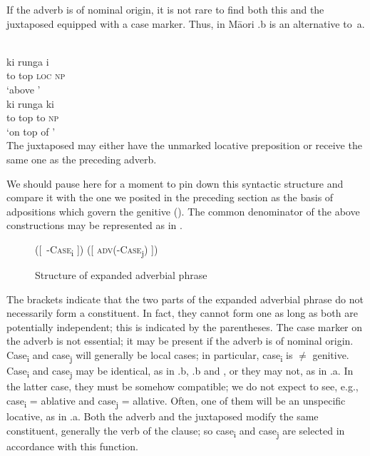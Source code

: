 If the adverb is of nominal origin, it is not rare to find both this and the juxtaposed \np equipped with a case marker. Thus, in M\=aori .b is an alternative to~a.

\ea\label{ex:E67}
 \\
 \ea
 \gll ki  runga  i  \np  \\
  to  top  \textsc{loc}  \textsc{np} \\
\glt ‘above \np’\\
\ex
\gll ki  runga  ki  \np  \\
  to  top to  \textsc{np} \\
  \glt ‘on top of \np’\\
\z
\z
\noindent The juxtaposed \np may either have the unmarked locative preposition or receive the same one as the preceding adverb.

We should pause here for a moment to pin down this syntactic structure and compare it with the one we posited in the preceding section as the basis of adpositions which govern the genitive (). The common denominator of the above constructions may be represented as in .

\begin{figure}
([~\np-\textsc{Case}\textsubscript{i} ])  ([ \textsc{adv}(-\textsc{Case}\textsubscript{j}) ])
\caption{Structure of expanded adverbial phrase}\label{ex:F5}
\end{figure}

\noindent The brackets indicate that the two parts of the expanded adverbial phrase do not necessarily form a constituent. In fact, they cannot form one as long as both are potentially independent; this is indicated by the parentheses. The case marker on the adverb is not essential; it may be present if the adverb is of nominal origin. Case\textsubscript{i} and case\textsubscript{j} will generally be local cases; in particular, case\textsubscript{i} is ${\neq}$ genitive. Case\textsubscript{i} and case\textsubscript{j} may be identical, as in .b, .b and , or they may not, as in .a. In the latter case, they must be somehow compatible; we do not expect to see, e.g., case\textsubscript{i} = ablative and case\textsubscript{j} = allative. Often, one of them will be an unspecific locative, as in .a. Both the adverb and the juxtaposed \np modify the same constituent, generally the verb of the clause; so case\textsubscript{i} and case\textsubscript{j} are selected in accordance with this function.

